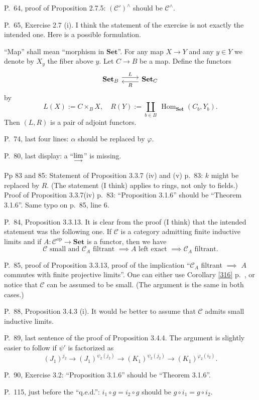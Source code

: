 \documentclass[12pt]{article}
\theoremstyle{remark}%
\newcommand{\n}{\noindent}
\newcommand{\C}{\mathcal C}
\newcommand{\Set}{\textbf{Set}}
\newcommand{\p}{\varphi}
\newcommand{\colim}{\operatornamewithlimits{\underset{\longrightarrow}{lim}}}
\DeclareMathOperator{\Hom}{Hom}
\DeclareMathOperator{\op}{op}
\begin{document}
\n P.~64, proof of Proposition 2.7.5: $(\C')^\wedge$ should be $\C^\wedge$. 

\n P.~65, Exercise 2.7 (i). I think the statement of the exercise is not exactly the intended one. Here is a possible formulation. 

``Map'' shall mean ``morphism in $\Set$''. For any map $X\to Y$ and any $y\in Y$ we denote by $X_y$ the fiber above $y$. Let $C\to B$ be a map. Define the functors 
$$
\begin{tikzcd}
\Set_B\ar[yshift=.7ex]{r}{L}&\Set_C\ar[yshift=-.7ex]{l}{R}
\end{tikzcd}
$$ 
by 
$$
L(X):=C\times_BX,\quad R(Y):=\coprod_{b\in B}\ \Hom_{\Set}(C_b,Y_b). 
$$ 
Then $(L,R)$ is a pair of adjoint functors. 

\n P.~74, last four lines: $\alpha$ should be replaced by $\varphi$. 

\n P.~80, last display: a ``$\displaystyle\colim$'' is missing.

\n Pp 83 and 85: Statement of Proposition 3.3.7 (iv) and (v) p.~83: $k$ might be replaced by $R$. (The statement (I think) applies to rings, not only to fields.) Proof of Proposition 3.3.7(iv) p.~83: ``Proposition 3.1.6'' should be ``Theorem 3.1.6''. Same typo on p.~85, line 6. 

\n P.~84, Proposition 3.3.13. It is clear from the proof (I think) that the intended statement was the following one. If $\C$ is a category admitting finite inductive limits and if $A:\C^{\op}\to\Set$ is a functor, then we have 
$$
\C\text{ small and }\C_A\text{ filtrant }\implies A\text{ left exact }\implies\C_A\text{ filtrant}.
$$

\n P.~85, proof of Proposition 3.3.13, proof of the implication ``$\C_A$ filtrant $\implies$ $A$ commutes with finite projective limits''. One can either use Corollary \ref{316} p.~\pageref{316}, or notice that $\C$ can be assumed to be small. (The argument is the same in both cases.) 

\n P.~88, Proposition 3.4.3 (i). It would be better to assume that $\C$ admits small inductive limits. 

\n P.~89, last sentence of the proof of Proposition 3.4.4. The argument is slightly easier to follow if $\psi'$ is factorized as 
$$
(J_1)^{j_2}\to(J_1)^{\psi_2(j_2)}\to(K_1)^{\psi_2(j_2)}\to(K_1)^{\p_2(i_2)}.
$$ 

\n P.~90, Exercise 3.2: ``Proposition 3.1.6'' should be ``Theorem 3.1.6''.

\n P.~115, just before the ``q.e.d.'': $i_1\circ g=i_2\circ g$ should be $g\circ i_1=g\circ i_2$. 
\end{document}
